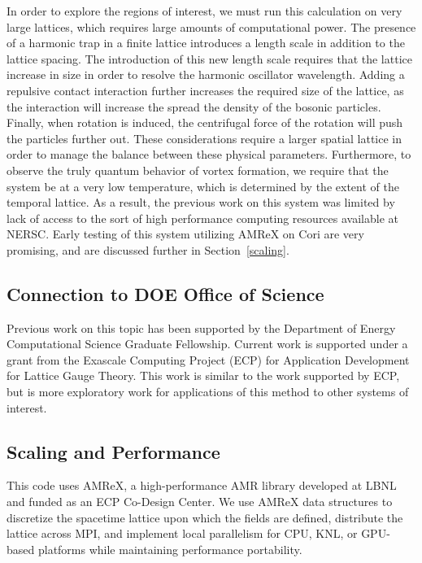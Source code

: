 \documentclass[onecolumn, 12pt]{article}
\begin{document}
In order to explore the regions of interest, we must run this calculation on very large lattices, which requires large amounts of computational power. The presence of a harmonic trap in a finite lattice introduces a length scale in addition to the lattice spacing. The introduction of this new length scale requires that the lattice increase in size in order to resolve the harmonic oscillator wavelength. Adding a repulsive contact interaction further increases the required size of the lattice, as the interaction will increase the spread the density of the bosonic particles. Finally, when rotation is induced, the centrifugal force of the rotation will push the particles further out. These considerations require a larger spatial lattice in order to manage the balance between these physical parameters. Furthermore, to observe the truly quantum behavior of vortex formation, we require that the system be at a very low temperature, which is determined by the extent of the temporal lattice. As a result, the previous work on this system was limited by lack of access to the sort of high performance computing resources available at NERSC. Early testing of this system utilizing AMReX on Cori are very promising, and are discussed further in Section~\ref{scaling}.

\subsection{Connection to DOE Office of Science}
Previous work on this topic has been supported by the Department of Energy Computational Science Graduate Fellowship. Current work is supported under a grant from the Exascale Computing Project (ECP) for Application Development for Lattice Gauge Theory. This work is similar to the work supported by ECP, but is more exploratory work for applications of this method to other systems of interest.

\subsection{\label{scaling}Scaling and Performance}

This code uses AMReX, a high-performance AMR library developed at LBNL and funded as an ECP Co-Design Center. We use AMReX data structures to discretize the spacetime lattice upon which the fields are defined, distribute the lattice across MPI, and implement local parallelism for CPU, KNL, or GPU-based platforms while maintaining performance portability. 
\end{document}
